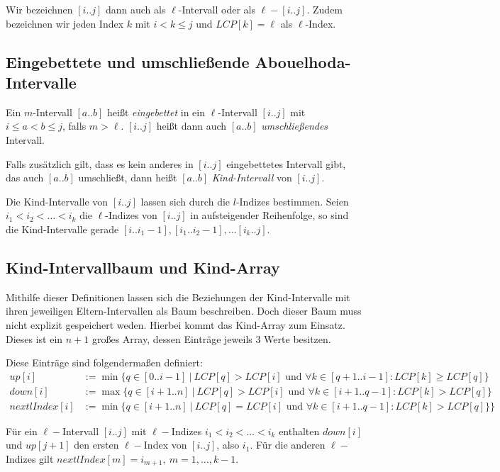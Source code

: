 Wir bezeichnen $[i..j]$ dann auch als $\ell$-Intervall oder als $\ell-[i..j]$. Zudem bezeichnen wir jeden Index $k$ mit $i < k \leq j$ und $LCP[k] = \ell$ als $\ell$-Index.

\subsection{Eingebettete und umschließende Abouelhoda-Intervalle}
\label{embeddedlcpintervals}

Ein $m$-Intervall $[a..b]$ heißt \textit{eingebettet} in ein $\ell$-Intervall $[i..j]$ mit $i \leq a < b \leq j$, falls $m > \ell$. $[i..j]$ heißt dann auch $[a..b]$ \textit{umschließendes} Intervall.

Falls zusätzlich gilt, dass es kein anderes in $[i..j]$ eingebettetes Intervall gibt, das auch $[a..b]$ umschließt, dann heißt $[a..b]$ \textit{Kind-Intervall} von $[i..j]$.

Die Kind-Intervalle von $[i..j]$ lassen sich durch die $l$-Indizes bestimmen. Seien $i_1 < i_2 < \dots < i_k$ die $\ell$-Indizes von $[i..j]$ in aufsteigender Reihenfolge, so sind die 
Kind-Intervalle gerade $[i.. i_1 - 1], [i_1.. i_2 - 1], \dots [i_k..j]$.

\subsection{Kind-Intervallbaum und Kind-Array}
\label{childtree}

Mithilfe dieser Definitionen lassen sich die Beziehungen der Kind-Intervalle mit ihren jeweiligen Eltern-Intervallen als Baum beschreiben.
Doch dieser Baum muss nicht explizit gespeichert weden. Hierbei kommt das Kind-Array zum Einsatz. Dieses ist ein $n + 1$ großes Array, dessen Einträge jeweils 3 Werte besitzen.

Diese Einträge sind folgendermaßen definiert:
\begin{align*}
	up[i] &:= \min\{q \in [0..i-1] \ |\ LCP[q] > LCP[i] \text{ und } \forall k \in [q + 1..i - 1] : LCP[k] \geq LCP[q]\}\\
	down[i] &:= \max\{q \in [i+1..n] \ |\ LCP[q] > LCP[i] \text{ und } \forall k \in [i + 1 .. q - 1] : LCP[k] > LCP[q]\}\\
	nextlIndex[i] &:= \min\{q \in [i+1..n] \ |\ LCP[q] = LCP[i] \text{ und } \forall k \in [i + 1 .. q - 1] : LCP[k] > LCP[q]\}\}
\end{align*}

Für ein $\ell-$Intervall $[i..j]$ mit $\ell-$Indizes $i_1 < i_2 < \dots < i_k$ enthalten $down[i]$ und $up[j+1]$ den ersten $\ell-$Index von $[i..j]$, also $i_1$. Für die anderen $\ell-$Indizes gilt $nextlIndex[m] = i_{m+1},\ m=1,\dots,k-1$.

